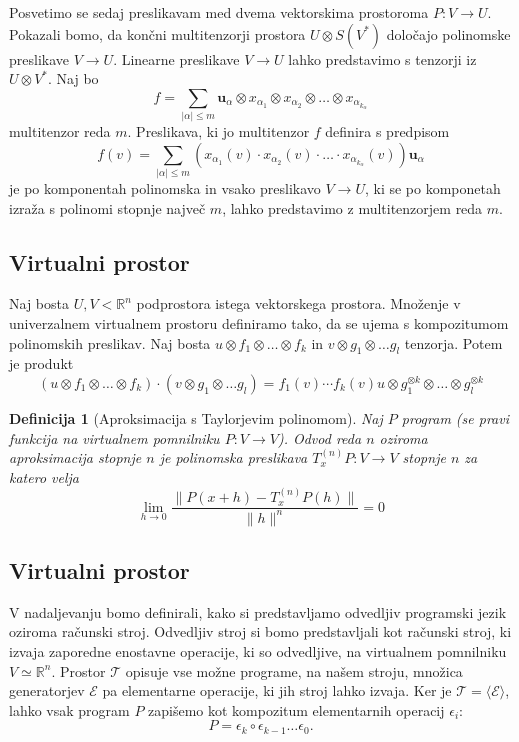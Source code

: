 \documentclass{article}
\newcommand{\RR}{\mathbb{R}}
\newcommand{\E}{\mathcal{E}}
\newcommand{\T}{\mathcal{T}}
\newcommand{\uu}{\mathbf{u}}
\newtheorem{definicija}{Definicija}[section]
\begin{document}
Posvetimo se sedaj preslikavam med dvema vektorskima prostoroma $P:V\to U$.
Pokazali bomo, da končni multitenzorji prostora $U\otimes S(V^*)$ določajo
polinomske preslikave $V\to U$. Linearne preslikave $V\to U$ lahko predstavimo s
tenzorji iz $U\otimes V^*$. Naj bo 
$$f=\sum_{|\alpha|\le m}\uu_\alpha\otimes x_{\alpha_1}\otimes x_{\alpha_2}\otimes
\ldots \otimes x_{\alpha_{k_\alpha}}$$ multitenzor reda $m$. Preslikava, ki jo
multitenzor $f$ definira s predpisom 
$$f(v) = \sum_{|\alpha|\le m}\left( x_{\alpha_1}(v)\cdot x_{\alpha_2}(v)\cdot
\ldots \cdot x_{\alpha_{k_\alpha}}(v) \right)\uu_\alpha$$
je po komponentah polinomska in vsako preslikavo $V\to U$, ki se po komponetah izraža s
polinomi stopnje največ $m$, lahko predstavimo z multitenzorjem reda $m$.
  
\subsection{Virtualni prostor}

Naj bosta $U, V < \RR^n$ podprostora istega vektorskega prostora. Množenje v
univerzalnem virtualnem prostoru definiramo tako, da se ujema s kompozitumom
polinomskih preslikav. Naj bosta $u\otimes f_1\otimes\ldots \otimes f_k$ in
$v\otimes g_1\otimes \ldots g_l$ tenzorja. Potem je produkt
\begin{equation}
  \label{eq:produkt}
 \left( u\otimes f_1\otimes\ldots \otimes f_k \right)\cdot \left(v\otimes g_1\otimes \ldots g_l\right) = f_1(v)\cdots f_k(v) u\otimes g_1^{\otimes k}\otimes \ldots \otimes g_l^{\otimes k}
\end{equation}

\begin{definicija}[Aproksimacija s Taylorjevim polinomom]
Naj $P$ program (se pravi funkcija na virtualnem pomnilniku $P:V\to V$). Odvod
reda $n$ oziroma aproksimacija stopnje $n$ je polinomska preslikava
$T^{(n)}_xP:V\to V$ stopnje $n$ za katero velja
\begin{equation}
  \label{eq:aprox}
  \lim_{h\to 0}\frac{\|P(x+h)-T^{(n)}_xP(h)\|}{\|h\|^n}=0
\end{equation}
\end{definicija}

\subsection{Virtualni prostor}

V nadaljevanju bomo definirali, kako si predstavljamo odvedljiv programski jezik
oziroma računski stroj. Odvedljiv stroj si bomo predstavljali kot računski
stroj, ki izvaja zaporedne enostavne operacije, ki so odvedljive, na virtualnem
pomnilniku $V\simeq\RR^n$. Prostor $\T$ opisuje vse možne programe, na našem
stroju, množica generatorjev $\E$ pa elementarne operacije, ki jih stroj lahko
izvaja. Ker je $\T=\langle \E \rangle$, lahko vsak program $P$ zapišemo kot
kompozitum elementarnih operacij $\epsilon_i$:
\[
P = \epsilon_k\circ\epsilon_{k-1}\ldots\epsilon_0.
\]  
\end{document}
